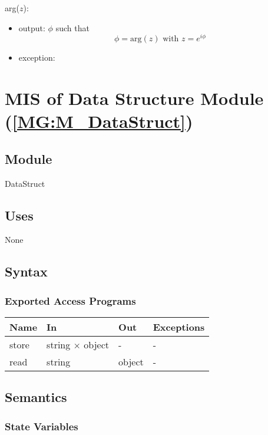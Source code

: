 \documentclass[12pt, titlepage]{article}
\begin{document}
\noindent arg($z$):
\begin{itemize} 
\item output: $\phi$ such that
\begin{equation*}
\phi=\text{arg}(z) \text{ with } z=e^{i\phi}
\end{equation*}
\item exception:
\end{itemize}


\section{MIS of Data Structure Module (\texorpdfstring{\cref{MG:M_DataStruct}}))} \label{MIS_DataStruct}

\subsection{Module}
DataStruct
\subsection{Uses}
None
\subsection{Syntax}

\subsubsection{Exported Access Programs}

\begin{center}
\begin{tabular}{p{4cm} p{4cm} p{4cm} p{2cm}}
\hline
\textbf{Name} & \textbf{In} & \textbf{Out} & \textbf{Exceptions} \\
\hline
store & string $\times$ object & - & - \\
read & string & object & - \\
\hline
\end{tabular}
\end{center}

\subsection{Semantics}

\subsubsection{State Variables}
\end{document}

